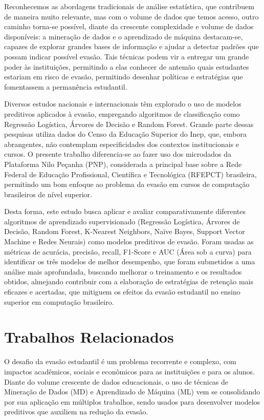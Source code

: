 \documentclass[english, spanish, brazilian]{RBIEarticle} %
\begin{document}
Reconhecemos as abordagens tradicionais de análise estatística, que contribuem de maneira muito relevante, mas com o volume de dados que temos acesso, outro caminho torna-se possível, diante da crescente complexidade e volume de dados disponíveis: a mineração de dados e o aprendizado de máquina destacam-se, capazes de explorar grandes bases de informação e ajudar a detectar padrões que possam indicar possível evasão. Tais técnicas podem vir a entregar um grande poder às instituições, permitindo a elas conhecer de antemão quais estudantes estariam em risco de evasão, permitindo desenhar políticas e estratégias que fomentassem a permanência estudantil.

Diversos estudos nacionais e internacionais têm explorado o uso de modelos preditivos aplicados à evasão, empregando algoritmos de classificação como Regressão Logística, Árvores de Decisão e Random Forest. Grande parte dessas pesquisas utiliza dados do Censo da Educação Superior do Inep, que, embora abrangentes, não contemplam especificidades dos contextos institucionais e cursos. O presente trabalho diferencia-se ao fazer uso dos microdados da Plataforma Nilo Peçanha (PNP), considerada a principal base sobre a Rede Federal de Educação Profissional, Científica e Tecnológica (RFEPCT) brasileira, permitindo um bom enfoque ao problema da evasão em cursos de computação brasileiros de nível superior.

Desta forma, este estudo busca aplicar e avaliar comparativamente diferentes algoritmos de aprendizado supervisionado (Regressão Logística, Árvores de Decisão, Random Forest, K-Nearest Neighbors, Naïve Bayes, Support Vector Machine e Redes Neurais) como modelos preditivos de evasão. Foram usadas as métricas de acurácia, precisão, recall, F1-Score e AUC (Área sob a curva) para identificar os três modelos de melhor desempenho, que foram submetidos a uma análise mais aprofundada, buscando melhorar o treinamento e os resultados obtidos, almejando contribuir com a elaboração de estratégias de retenção mais eficazes e acertadas, que mitiguem os efeitos da evasão estudantil no ensino superior em computação brasileiro.

\section{Trabalhos Relacionados}
O desafio da evasão estudantil é um problema recorrente e complexo, com impactos acadêmicos, sociais e econômicos para as instituições e para os alunos. Diante do volume crescente de dados educacionais, o uso de técnicas de Mineração de Dados (MD) e Aprendizado de Máquina (ML) vem se consolidando por sua aplicação em múltiplos trabalhos, sendo usados para desenvolver modelos preditivos que auxiliem na redução da evasão.
\end{document}
